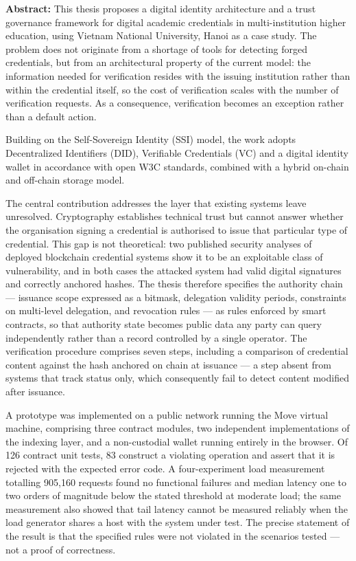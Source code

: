 
{
\textbf{Abstract:} This thesis proposes a digital identity architecture and a trust governance framework for digital academic credentials in multi-institution higher education, using Vietnam National University, Hanoi as a case study. The problem does not originate from a shortage of tools for detecting forged credentials, but from an architectural property of the current model: the information needed for verification resides with the issuing institution rather than within the credential itself, so the cost of verification scales with the number of verification requests. As a consequence, verification becomes an exception rather than a default action.

Building on the Self-Sovereign Identity (SSI) model, the work adopts Decentralized Identifiers (DID), Verifiable Credentials (VC) and a digital identity wallet in accordance with open W3C standards, combined with a hybrid on-chain and off-chain storage model.

The central contribution addresses the layer that existing systems leave unresolved. Cryptography establishes technical trust but cannot answer whether the organisation signing a credential is authorised to issue that particular type of credential. This gap is not theoretical: two published security analyses of deployed blockchain credential systems show it to be an exploitable class of vulnerability, and in both cases the attacked system had valid digital signatures and correctly anchored hashes. The thesis therefore specifies the authority chain --- issuance scope expressed as a bitmask, delegation validity periods, constraints on multi-level delegation, and revocation rules --- as rules enforced by smart contracts, so that authority state becomes public data any party can query independently rather than a record controlled by a single operator. The verification procedure comprises seven steps, including a comparison of credential content against the hash anchored on chain at issuance --- a step absent from systems that track status only, which consequently fail to detect content modified after issuance.

A prototype was implemented on a public network running the Move virtual machine, comprising three contract modules, two independent implementations of the indexing layer, and a non-custodial wallet running entirely in the browser. Of 126 contract unit tests, 83 construct a violating operation and assert that it is rejected with the expected error code. A four-experiment load measurement totalling 905,160 requests found no functional failures and median latency one to two orders of magnitude below the stated threshold at moderate load; the same measurement also showed that tail latency cannot be measured reliably when the load generator shares a host with the system under test. The precise statement of the result is that the specified rules were not violated in the scenarios tested --- not a proof of correctness.

}
